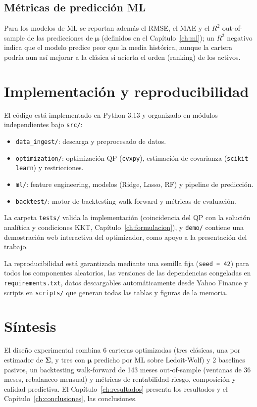 \subsection{Métricas de predicción ML}

Para los modelos de ML se reportan además el RMSE, el MAE y el $R^2$
out-of-sample de las predicciones de $\boldsymbol{\mu}$ (definidos en el
Capítulo~\ref{ch:ml}); un $R^2$ negativo indica que el modelo predice peor que
la media histórica, aunque la cartera podría aun así mejorar a la clásica si
acierta el orden (ranking) de los activos.

\section{Implementación y reproducibilidad}

El código está implementado en Python 3.13 y organizado en módulos
independientes bajo \texttt{src/}:

\begin{itemize}
    \item \texttt{data\_ingest/}: descarga y preprocesado de datos.
    \item \texttt{optimization/}: optimización QP (\texttt{cvxpy}),
          estimación de covarianza (\texttt{scikit-}\allowbreak\texttt{learn})
          y restricciones.
    \item \texttt{ml/}: feature engineering, modelos (Ridge, Lasso, RF) y
          pipeline de predicción.
    \item \texttt{backtest/}: motor de backtesting walk-forward y métricas
          de evaluación.
\end{itemize}

La carpeta \texttt{tests/} valida la implementación (coincidencia del QP con la
solución analítica y condiciones KKT, Capítulo~\ref{ch:formulacion}), y
\texttt{demo/} contiene una demostración web interactiva del optimizador, como
apoyo a la presentación del trabajo.

La reproducibilidad está garantizada mediante una semilla fija
(\texttt{seed = 42}) para todos los componentes aleatorios, las versiones de las
dependencias congeladas en \texttt{requirements.txt}, datos descargables
automáticamente desde Yahoo Finance y scripts en \texttt{scripts/} que generan
todas las tablas y figuras de la memoria.

\section{Síntesis}

El diseño experimental combina 6 carteras optimizadas (tres clásicas, una por
estimador de $\boldsymbol{\Sigma}$, y tres con $\boldsymbol{\mu}$ predicho por
ML sobre Ledoit-Wolf) y 2 baselines pasivos, un backtesting walk-forward de 143 meses out-of-sample (ventanas de 36
meses, rebalanceo mensual) y métricas de rentabilidad-riesgo, composición y
calidad predictiva. El Capítulo~\ref{ch:resultados} presenta los resultados y
el Capítulo~\ref{ch:conclusiones}, las conclusiones.
